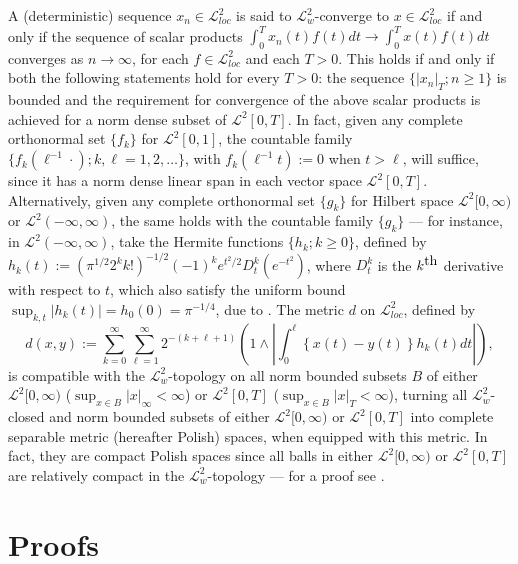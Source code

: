 \documentclass[final]{amsart}
\theoremstyle{definition}
\numberwithin{equation}{section}
\newcommand{\cL}{\ensuremath{\mathcal{L}}}
\begin{document}
A (deterministic) sequence $x_n\in\cL^2_{loc}$ is said to $\cL^2_w$-converge to $x\in\cL^2_{loc}$ if and only if the sequence of scalar products $\int_0^Tx_n(t)f(t)dt \to \int_0^Tx(t)f(t)dt$ converges as $n\to\infty$, for each $f\in\cL^2_{loc}$ and each $T>0$.
This holds if and only if both the following statements hold  for every $T>0$: the sequence $\bigl\{|x_n|_T; n\ge1\bigr\}$ is bounded
and the requirement for convergence of the above scalar products is achieved for a norm dense subset of $\cL^2[0,T]$.
In fact, given any complete orthonormal set $\{f_k\}$ for $\cL^2[0,1]$, the countable family
$\{f_k(\ell^{-1}\cdot); k,\ell=1,2,\ldots\}$, with $f_k(\ell^{-1}t):=0$ when $t>\ell$,
will suffice, since it has a norm dense linear span in each vector space $\cL^2[0,T]$.
Alternatively, given any complete orthonormal set $\{g_k\}$ for Hilbert space $\cL^2[0,\infty)$ or $\cL^2(-\infty,\infty)$,
the same holds with the countable family $\{g_k\}$ --- for instance, in $\cL^2(-\infty,\infty)$,
take the Hermite functions $\{h_k;k\ge0\}$, defined by
$h_k(t):=(\pi^{1/2}2^kk!)^{-1/2}(-1)^ke^{t^2/2}D^k_t(e^{-t^2})$, where $D^k_t$ is the $k^{\hbox{th}}$ derivative with
respect to $t$, which also satisfy the uniform bound $\sup_{k,t}|h_k(t)|=h_0(0)=\pi^{-1/4}$, due to \citet{Szasz:1951}.
The metric $d$ on $\cL^2_{loc}$, defined by
$$
d(x,y):=\sum_{k=0}^\infty \sum_{\ell=1}^\infty 2^{-(k+\ell+1)}\left(1\wedge\left|\int_0^\ell\left\{x(t)-y(t)\right\}h_k(t)dt\right|\right),
$$
is compatible with the $\cL^2_w$-topology on all norm bounded subsets $B$ of either $\cL^2[0,\infty)$ ($\sup_{x\in B}|x|_\infty<\infty$)
or $\cL^2[0,T]$ ($\sup_{x\in B}|x|_T<\infty$), turning all $\cL^2_w$-closed and norm bounded subsets of
either $\cL^2[0,\infty)$ or $\cL^2[0,T]$ into complete separable metric (hereafter Polish) spaces, when equipped with this metric.
In fact, they are compact Polish spaces since all balls in either $\cL^2[0,\infty)$ or $\cL^2[0,T]$
are relatively compact in the $\cL^2_w$-topology --- for a proof see \citet{Lieb/Loss:2001}.


\section{Proofs}\label{app:remvail_prfs}
\end{document}
